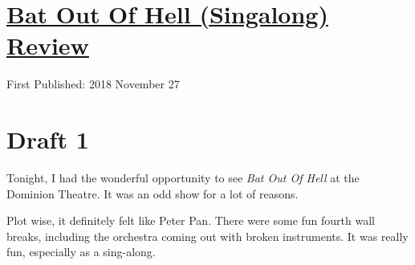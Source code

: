 \documentclass[12pt]{article}[titlepage]
\newcommand{\1}{\={a}}
\newcommand{\2}{\={e}}
\newcommand{\3}{\={\i}}
\newcommand{\4}{\=o}
\newcommand{\5}{\=u}
\newcommand{\6}{\={A}}
\renewcommand{\,}{\textsuperscript{,}}
\begin{document}
\doublespacing
\section{\href{bat-out-of-hell.html}{Bat Out Of Hell (Singalong) Review}}
First Published: 2018 November 27
\section{Draft 1}
Tonight, I had the wonderful opportunity to see \textit{Bat Out Of Hell} at the Dominion Theatre.
It was an odd show for a lot of reasons.

Plot wise, it definitely felt like Peter Pan.
There were some fun fourth wall breaks, including the orchestra coming out with broken instruments.
It was really fun, especially as a sing-along.
\end{document}
